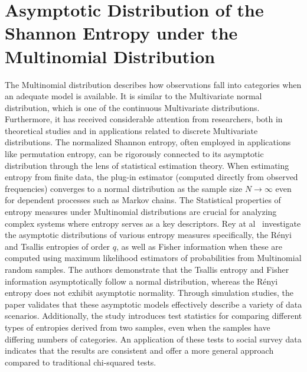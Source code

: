 \section {Asymptotic Distribution of the Shannon Entropy under the Multinomial Distribution} \label{Sec:AsymptoticDistribution}

The Multinomial distribution describes how observations fall into categories when an adequate model is available. It is similar to the Multivariate normal distribution, which is one of the continuous Multivariate distributions. Furthermore, it has received considerable attention from researchers, both in theoretical studies and in applications related to discrete Multivariate distributions. 
The normalized Shannon entropy, often employed in applications like permutation entropy, can be rigorously connected to its asymptotic distribution through the lens of statistical estimation theory. When estimating entropy from finite data, the plug-in estimator (computed directly from observed frequencies) converges to a normal distribution as the sample size $N\longrightarrow \infty$ even for dependent processes such as Markov chains. 
The Statistical properties of entropy measures under Multinomial distributions are crucial for analyzing complex systems where entropy serves as a key descriptors. Rey at al~\cite{Rey2023} investigate the asymptotic distributions of various entropy measures specifically, the Rényi and Tsallis entropies of order $q$, as well as Fisher information when these are computed using maximum likelihood estimators of probabilities from Multinomial random samples. The authors demonstrate that the Tsallis entropy and Fisher information asymptotically follow a normal distribution, whereas the Rényi entropy does not exhibit asymptotic normality. Through simulation studies, the paper validates that these asymptotic models effectively describe a variety of data scenarios. Additionally, the study introduces test statistics for comparing different types of entropies derived from two samples, even when the samples have differing numbers of categories. An application of these tests to social survey data indicates that the results are consistent and offer a more general approach compared to traditional chi-squared tests. 


